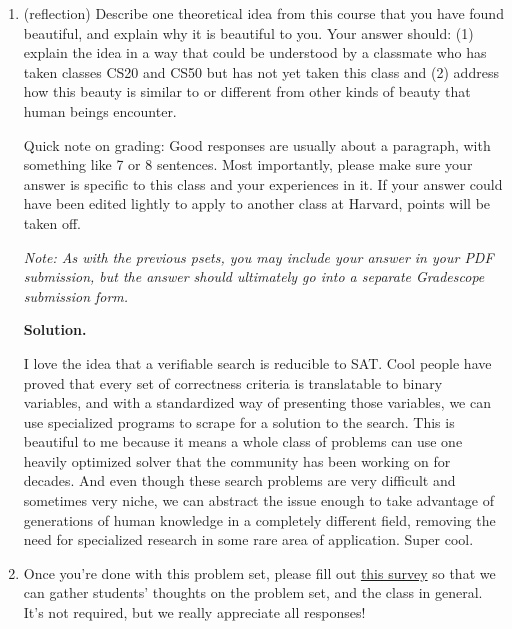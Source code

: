 \documentclass[11pt]{article}
\newenvironment{soln}{%
  \par\medskip\noindent\begingroup\color{blue}\textbf{Solution.}\ %
}{%
  \endgroup\par\medskip%
}
\begin{document}
\begin{enumerate}
\textit{(Fun Fact: A remarkable property of quantum computers is that they can solve \Factoring in polynomial time, via Shor's algorithm. This does not mean that quantum computers can solve any problem in $\NPsearch$ in polynomial time, as \Factoring is not believed to be $\NPsearch$-complete).
}\\

\item (reflection) Describe one theoretical idea from this course that you have found beautiful, and explain why it is beautiful to you.  Your answer should: (1) explain the idea in a way that could be understood by a classmate who has taken classes CS20 and CS50 but has not yet taken this class and (2) address how this beauty is similar to or different from other kinds of beauty that human beings encounter.

Quick note on grading: Good responses are usually about a paragraph, with something like 7 or 8 sentences. Most importantly, please make sure your answer is specific to this class and your experiences in it. If your answer could have been edited lightly to apply to another class at Harvard, points will be taken off.

\textit{Note: As with the previous psets, you may include your answer in your PDF submission, but the answer should ultimately go into a separate Gradescope submission form.}

\begin{soln}
I love the idea that a verifiable search is reducible to SAT. Cool people have proved that every set of correctness criteria is translatable to binary variables, and with a standardized way of presenting those variables, we can use specialized programs to scrape for a solution to the search. This is beautiful to me because it means a whole class of problems can use one heavily optimized solver that the community has been working on for decades. And even though these search problems are very difficult and sometimes very niche, we can abstract the issue enough to take advantage of generations of human knowledge in a completely different field, removing the need for specialized research in some rare area of application. Super cool.
\end{soln}

\item Once you're done with this problem set, please fill out \href{https://forms.gle/b2yJAorxffJSueVd6}{this survey} so that we can gather students' thoughts on the problem set, and the class in general. It's not required, but we really appreciate all responses!

\end{enumerate}
\end{document}

